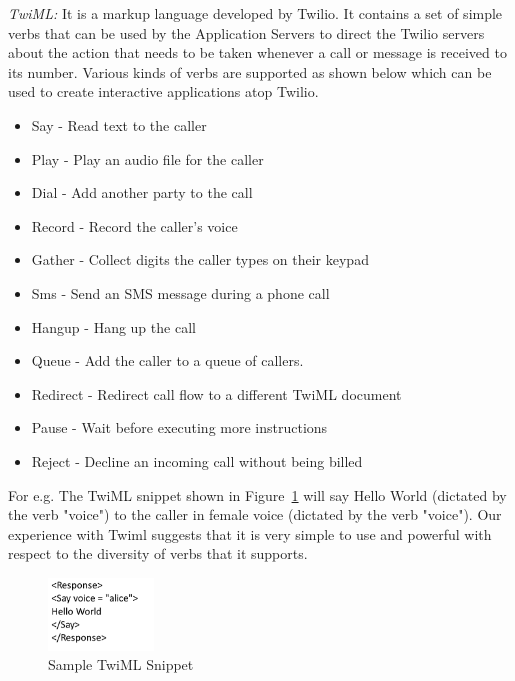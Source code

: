 \emph{TwiML:  } It is a markup language developed by Twilio. It contains a set of simple verbs that can be used by the Application Servers to direct the Twilio servers about the action that needs to be taken whenever a call or message is received to its number. Various kinds of verbs are supported as shown below which can be used to create interactive applications atop Twilio.
\begin{itemize}
\item Say - Read text to the caller 
\item Play - Play an audio file for the caller
\item Dial - Add another party to the call
\item Record - Record the caller's voice
\item Gather - Collect digits the caller types on their keypad
\item Sms - Send an SMS message during a phone call
\item Hangup - Hang up the call
\item Queue - Add the caller to a queue of callers.
\item Redirect - Redirect call flow to a different TwiML document
\item Pause - Wait before executing more instructions
\item Reject - Decline an incoming call without being billed
\end{itemize}

For e.g. The TwiML snippet shown in Figure~\ref{fig:TwilML} will say Hello World (dictated by the verb "voice") to the caller in female voice (dictated by the verb "voice"). Our experience with Twiml suggests that it is very simple to use and powerful with respect to the diversity of verbs that it supports.
 
\begin{figure}
\centering
  \includegraphics[width=0.25\textwidth]{figs/TwiML.png}
\caption{Sample TwiML Snippet}
\label{fig:TwilML}
\end{figure} 

